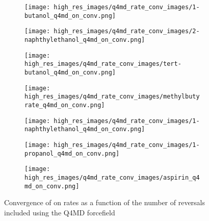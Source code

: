 \begin{figure}
\begin{subfigure}{0.3\linewidth}
	\centering
	\texttt{[image: high\_res\_images/q4md\_rate\_conv\_images/1-butanol\_q4md\_on\_conv.png]}
	\end{subfigure}%
\begin{subfigure}{0.3\linewidth}
		\texttt{[image: high\_res\_images/q4md\_rate\_conv\_images/2-naphthylethanol\_q4md\_on\_conv.png]}
\end{subfigure}%
	\begin{subfigure}{0.3\linewidth}
		\texttt{[image: high\_res\_images/q4md\_rate\_conv\_images/tert-butanol\_q4md\_on\_conv.png]}
	\end{subfigure}
	\begin{subfigure}{0.3\linewidth}
		\texttt{[image: high\_res\_images/q4md\_rate\_conv\_images/methylbutyrate\_q4md\_on\_conv.png]}
	\end{subfigure}
	\begin{subfigure}{0.3\linewidth}
		\texttt{[image: high\_res\_images/q4md\_rate\_conv\_images/1-naphthylethanol\_q4md\_on\_conv.png]}
	\end{subfigure}
	\begin{subfigure}{0.3\linewidth}
		\texttt{[image: high\_res\_images/q4md\_rate\_conv\_images/1-propanol\_q4md\_on\_conv.png]}
	\end{subfigure}
	\begin{subfigure}{0.3\linewidth}
		\texttt{[image: high\_res\_images/q4md\_rate\_conv\_images/aspirin\_q4md\_on\_conv.png]}
	\end{subfigure}
	\caption{Convergence of on rates as a function of the number of reversals included using the Q4MD forcefield}
\end{figure}